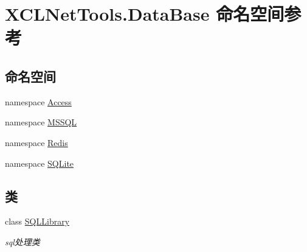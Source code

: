 \hypertarget{namespace_x_c_l_net_tools_1_1_data_base}{}\section{X\+C\+L\+Net\+Tools.\+Data\+Base 命名空间参考}
\label{namespace_x_c_l_net_tools_1_1_data_base}
\subsection*{命名空间}
\begin{DoxyCompactItemize}
\item 
namespace \hyperlink{namespace_x_c_l_net_tools_1_1_data_base_1_1_access}{Access}
\item 
namespace \hyperlink{namespace_x_c_l_net_tools_1_1_data_base_1_1_m_s_s_q_l}{M\+S\+S\+QL}
\item 
namespace \hyperlink{namespace_x_c_l_net_tools_1_1_data_base_1_1_redis}{Redis}
\item 
namespace \hyperlink{namespace_x_c_l_net_tools_1_1_data_base_1_1_s_q_lite}{S\+Q\+Lite}
\end{DoxyCompactItemize}
\subsection*{类}
\begin{DoxyCompactItemize}
\item 
class \hyperlink{class_x_c_l_net_tools_1_1_data_base_1_1_s_q_l_library}{S\+Q\+L\+Library}
\begin{DoxyCompactList}\small\item\em sql处理类 \end{DoxyCompactList}\end{DoxyCompactItemize}
